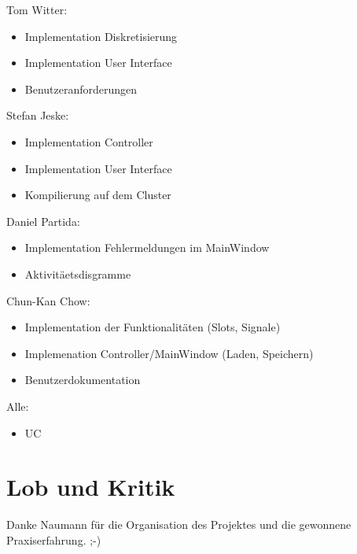 Tom Witter:
\begin{itemize}
\item Implementation Diskretisierung
\item Implementation User Interface
\item Benutzeranforderungen
\end{itemize}
Stefan Jeske:
\begin{itemize}
\item Implementation Controller
\item Implementation User Interface
\item Kompilierung auf dem Cluster
\end{itemize}
Daniel Partida:
\begin{itemize}
\item Implementation Fehlermeldungen im MainWindow
\item Aktivit\"aetsdisgramme
\end{itemize}
Chun-Kan Chow:
\begin{itemize}
\item Implementation der Funktionalit\"aten (Slots, Signale)
\item Implemenation Controller/MainWindow (Laden, Speichern)
\item Benutzerdokumentation
\end{itemize}
Alle:
\begin{itemize}
\item UC
\end{itemize}

\section{Lob und Kritik}
\label{sec:1.3}

Danke Naumann f\"ur die Organisation des Projektes und die gewonnene Praxiserfahrung. ;-)

